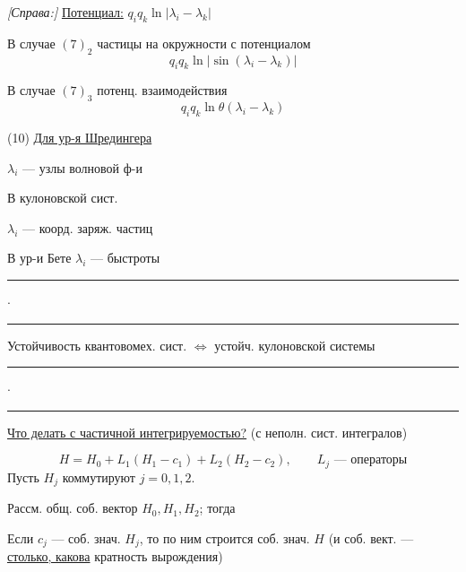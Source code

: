 \textit{[Справа:]} \underline{Потенциал:}
$q_iq_k\ln|\lambda_i-\lambda_k|$

В случае $(7)_2$
частицы на окружности с потенциалом
\begin{equation*}
q_iq_k\ln|\sin(\lambda_i-\lambda_k)|
\end{equation*}

В случае $(7)_3$ потенц. взаимодействия
\begin{equation*}
q_iq_k\ln\theta(\lambda_i-\lambda_k)
\end{equation*}

(10) \underline{Для ур-я Шредингера}

$\lambda_i$ --- узлы волновой ф-и

В кулоновской сист.

$\lambda_i$ --- коорд. заряж. частиц

В ур-и Бете $\lambda_i$ --- быстроты

\begin{center}
\rule{2cm}{0.4pt}\quad$\cdot$\quad\rule{2cm}{0.4pt}
\end{center}

Устойчивость квантовомех. сист. $\Leftrightarrow$ устойч. кулоновской системы

\begin{center}
\rule{2cm}{0.4pt}\quad$\cdot$\quad\rule{2cm}{0.4pt}
\end{center}

\underline{Что делать с частичной интегрируемостью?}
(с неполн. сист. интегралов)

\begin{equation*}
H=H_0+L_1(H_1-c_1)+L_2(H_2-c_2),
\qquad L_j\text{ --- операторы}
\tag{11}
\end{equation*}
Пусть $H_j$ коммутируют $j=0,1,2$.



Рассм. общ. соб. вектор $H_0,H_1,H_2$; тогда

Если $c_j$ — соб. знач. $H_j$, то по ним строится соб. знач.
 $H$
(и  соб. вект. — \underline{столько, какова} кратность вырождения)

